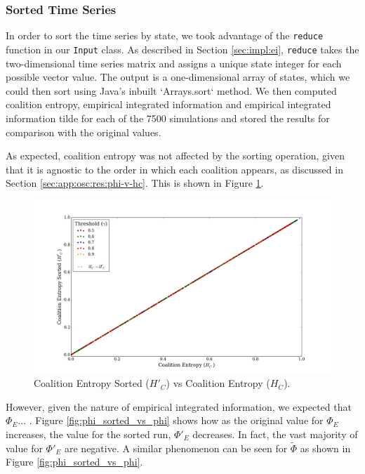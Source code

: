 \documentclass[a4paper,11pt]{article}
\begin{document}
\subsubsection{Sorted Time Series}

In order to sort the time series by state, we took advantage of the \texttt{reduce} function in our \texttt{Input} class. As described in Section \ref{sec:impl:ei}, \texttt{reduce} takes the two-dimensional time series matrix and assigns a unique state integer for each possible vector value. The output is a one-dimensional array of states, which we could then sort using Java's inbuilt `Arrays.sort` method. We then computed coalition entropy, empirical integrated information and empirical integrated information tilde for each of the 7500 simulations and stored the results for comparison with the original values.

As expected, coalition entropy was not affected by the sorting operation, given that it is agnostic to the order in which each coalition appears, as discussed in Section \ref{sec:app:osc:res:phi-v-hc}. This is shown in Figure \ref{fig:hc_sorted_vs_hc}.

\begin{figure}[H]
\begin{center}
\includegraphics[scale = 0.35]{figures/hc_sorted_vs_hc}
\caption{
	Coalition Entropy Sorted ($H'_C$) vs Coalition Entropy ($H_C$).
	\label{fig:hc_sorted_vs_hc}
}
\end{center}
\end{figure}

However, given the nature of empirical integrated information, we expected that $\Phi_E$... . Figure \ref{fig:phi_sorted_vs_phi} shows how as the original value for $\Phi_E$ increases, the value for the sorted run, $\Phi'_E$ decreases. In fact, the vast majority of value for $\Phi'_E$ are negative. A similar phenomenon can be seen for $\widetilde{\Phi}$ as shown in Figure \ref{fig:phi_sorted_vs_phi}. 
\end{document}
